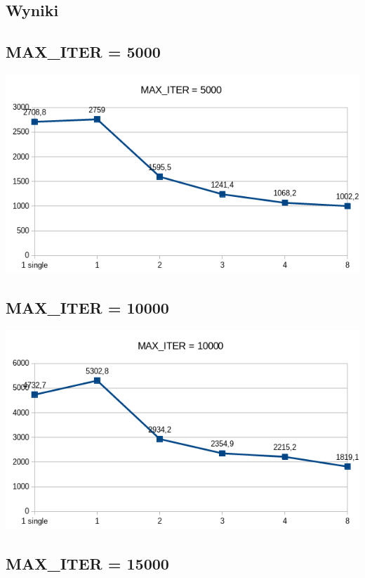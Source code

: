 \documentclass[a4paper,10pt]{article}
\begin{document}
\subsection*{Wyniki}

\subsection{MAX\_ITER = 5000}

\includegraphics[width=\textwidth]{1.png}

\vspace*{20mm}

\subsection{MAX\_ITER = 10000}

\includegraphics[width=\textwidth]{2.png}

\subsection{MAX\_ITER = 15000}
\end{document}
